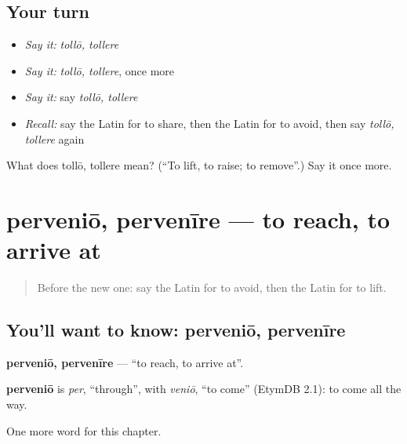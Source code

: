 \subsection*{Your turn}
\begin{itemize}
\raggedright
  \item \emph{Say it:} \emph{tollō, tollere}
  \item \emph{Say it:} \emph{tollō, tollere}, once more
  \item \emph{Say it:} say \emph{tollō, tollere}
  \item \emph{Recall:} say the Latin for to share, then the Latin for to avoid, then say \emph{tollō, tollere} again
\end{itemize}

\begin{tcolorbox}[breakable,colback=teal!4,colframe=teal!35!black,title={Before you move on}]
What does tollō, tollere mean? (\textquotedblleft{}To lift, to raise; to remove\textquotedblright{}.) Say it once more.
\end{tcolorbox}
\section[perveniō, pervenīre]{perveniō, pervenīre — to reach, to arrive at}

\label{lesson:LA-C200-pervenio}



\begin{quote}
Before the new one: say the Latin for to avoid, then the Latin for to lift.
\end{quote}

\subsection*{You'll want to know: perveniō, pervenīre}
\textbf{perveniō, pervenīre} — \textquotedblleft{}to reach, to arrive at\textquotedblright{}.

\begin{cousinweb}
\textbf{perveniō} is \emph{per}, \textquotedblleft{}through\textquotedblright{}, with \emph{veniō}, \textquotedblleft{}to come\textquotedblright{} (EtymDB 2.1): to come all the way.
\end{cousinweb}

\begin{grammarlens}[title={What you've built}]
One more word for this chapter.
\end{grammarlens}

